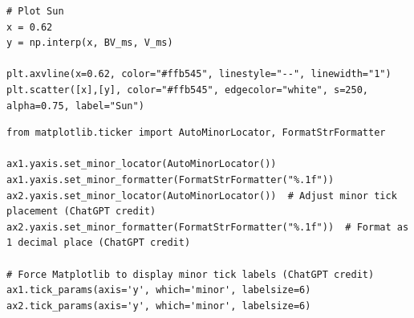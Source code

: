 \documentclass[12pt]{article}
\begin{document}
\begin{minipage}{\linewidth}
\captionsetup{hypcap=false}

\begin{mintedbox}
\begin{verbatim}
# Plot Sun
x = 0.62
y = np.interp(x, BV_ms, V_ms)

plt.axvline(x=0.62, color="#ffb545", linestyle="--", linewidth="1")
plt.scatter([x],[y], color="#ffb545", edgecolor="white", s=250, alpha=0.75, label="Sun")
\end{verbatim}
\end{mintedbox}

\end{minipage}

\begin{minipage}{\linewidth}
\captionsetup{hypcap=false}

\begin{mintedbox}
\begin{verbatim}
from matplotlib.ticker import AutoMinorLocator, FormatStrFormatter

ax1.yaxis.set_minor_locator(AutoMinorLocator())
ax1.yaxis.set_minor_formatter(FormatStrFormatter("%.1f")) 
ax2.yaxis.set_minor_locator(AutoMinorLocator())  # Adjust minor tick placement (ChatGPT credit)
ax2.yaxis.set_minor_formatter(FormatStrFormatter("%.1f"))  # Format as 1 decimal place (ChatGPT credit)

# Force Matplotlib to display minor tick labels (ChatGPT credit)
ax1.tick_params(axis='y', which='minor', labelsize=6)
ax2.tick_params(axis='y', which='minor', labelsize=6)

\end{verbatim}
\end{mintedbox}

\end{minipage}
\end{document}
